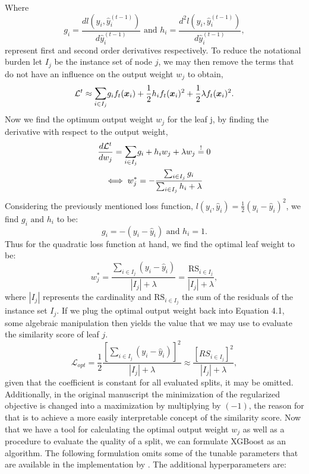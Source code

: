 \documentclass[a4paper,12pt, headsepline]{scrartcl}
\numberwithin{equation}{section}
\begin{document}
Where 
\[
g_i = \frac{d l(y_i, \hat y_i^{(t-1)})}{d \hat y_i^{(t-1)}} \text{ and } h_i = \frac{d^2 l(y_i, \hat y_i^{(t-1)})}{d \hat y_i^{(t-1)}},
\]
represent first and second order derivatives respectively. To reduce the notational burden let $I_j$ be the instance set of node $j$, we may then remove the terms that do not have an influence on the output weight $w_j$ to obtain, 
\begin{gather}
\mathcal{L}^t \approx \mathlarger{\sum}\limits_{i \in I_j} g_i f_t(\bm x_i) + \frac{1}{2}h_i f_t( \bm x_i)^2 + \frac{1}{2}\lambda f_t(\bm x_i)^2.
\end{gather}
Now we find the optimum output weight $w_j$ for the leaf j, by finding the derivative with respect to the output weight,
\begin{gather*}
\frac{d \mathcal{L}^t}{d w_j} =  \mathlarger{\sum}\limits_{i \in I_j} g_i + h_i w_j + \lambda w_j \overset{!}{=} 0 \\ \iff w^*_j = - \frac{\sum_{i \in I_j} g_i}{\sum_{i \in I_j} h_i + \lambda}
\end{gather*}
Considering the previously mentioned loss function, $l(y_i, \hat y_i) = \frac{1}{2} (y_i - \hat  y_i)^2$, we find $g_i \text{ and } h_i$ to be:
\[
g_i = -(y_i - \hat y_i)\text{ and } h_i = 1.
\]
Thus for the quadratic loss function at hand, we find the optimal leaf weight to be:
\[
w^*_j =  \frac{\sum_{i \in I_j} (y_i - \hat  y_i)}{|I_j| + \lambda} = \frac{\text{RS}_{i \in I_j}}{|I_j| + \lambda},
\]
where $|I_j|$ represents the cardinality and $\text{RS}_{i \in I_j}$ the sum of the residuals of the instance set $I_j$. If we plug the optimal output weight back into Equation 4.1, some algebraic manipulation then yields the value that we may use to evaluate the similarity score of leaf $j$.
\[
\mathcal{L}_{opt} = \frac{1}{2}\frac{[\sum_{i \in I_j} (y_i - \hat  y_i)]^2}{|I_j| + \lambda} \approx \frac{[RS_{i \in I_j}]^2}{|I_j| + \lambda},
\]
given that the coefficient is constant for all evaluated splits, it may be omitted. Additionally, in the original manuscript the minimization of the regularized objective is changed into a maximization by multiplying by $(-1)$, the reason for that is to achieve a more easily interpretable concept of the similarity score. Now that we have a tool for calculating the optimal output weight $w_j$ as well as a procedure to evaluate the quality of a split, we can formulate XGBoost as an algorithm. The following formulation omits some of the tunable parameters that are available in the implementation by \citet{xgboost}. The additional hyperparameters are:
\end{document}
